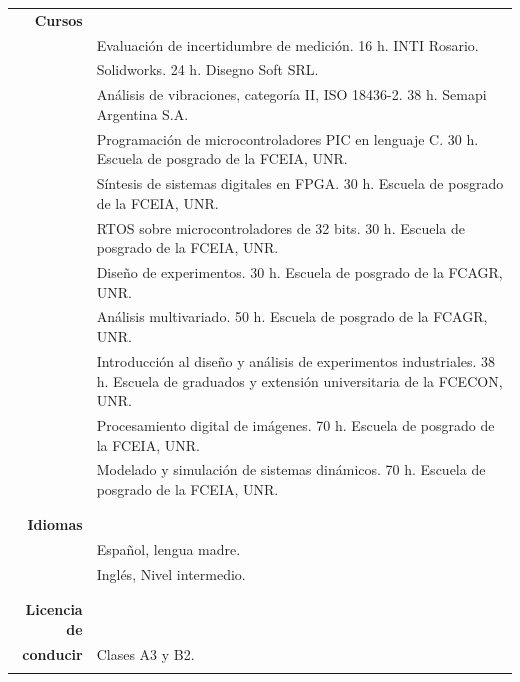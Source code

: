 \documentclass[a4paper,10pt, sans]{article}
\begin{document}
  
  \begin{table}[H]
  \centering
  \begin{tabularx}{\textwidth}{r X}  

\textbf{Cursos} & {}\\ [1ex]
    
      {} & Evaluación de incertidumbre de medición. 16 h. INTI Rosario. \\ 
      {} & Solidworks. 24 h. Disegno Soft SRL. \\
      {} & Análisis de vibraciones, categoría II, ISO 18436-2. 38 h. Semapi Argentina S.A.\\
      {} & Programación de microcontroladores PIC en lenguaje C. 30 h. Escuela de posgrado de la FCEIA, UNR. \\
      {} & Síntesis de sistemas digitales en FPGA. 30 h. Escuela de posgrado de la FCEIA, UNR. \\
      {} & RTOS sobre microcontroladores de 32 bits. 30 h. Escuela de posgrado de la FCEIA, UNR. \\
      {} & Diseño de experimentos. 30 h. Escuela de posgrado de la FCAGR, UNR. \\
      {} & Análisis multivariado. 50 h. Escuela de posgrado de la FCAGR, UNR. \\
      {} & Introducción al diseño y análisis de experimentos industriales. 38 h. Escuela de graduados y extensión universitaria de la FCECON, UNR. \\
      {} & Procesamiento digital de imágenes. 70 h. Escuela de posgrado de la FCEIA, UNR. \\
      {} & Modelado y simulación de sistemas dinámicos. 70 h. Escuela de posgrado de la FCEIA, UNR. \\ \\ \hline \\
    
\textbf{Idiomas} & {} \\ [1ex]
    {} & Español, lengua madre. \\ [1ex]
    {} & Inglés, Nivel intermedio. \\ \\ \hline \\
      
    \textbf{Licencia de} & {} \\ [1ex]
    \textbf{conducir} & Clases A3 y B2.\\
    
\vspace{5cm}
    
    
    
    
        
  \end{tabularx}
  \end{table}
  
\end{document}
